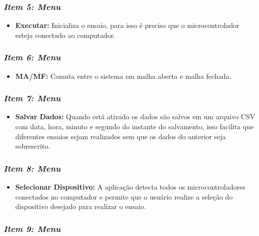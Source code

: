 \subsubsection*{\textit{Item 5: Menu}}

\begin{itemize}
        \setlength{\itemsep}{-2pt}
	\item \textbf{Executar:} Inicializa o ensaio, para isso é preciso que o microcontrolador esteja conectado ao computador.
\end{itemize}


\subsubsection*{\textit{Item 6: Menu}}

\begin{itemize}
        \setlength{\itemsep}{-2pt}
	\item \textbf{MA/MF:} Comuta entre o sistema em malha aberta e malha fechada.
\end{itemize}


\subsubsection*{\textit{Item 7: Menu}}

\begin{itemize}
        \setlength{\itemsep}{-2pt}
	\item \textbf{Salvar Dados:} Quando está ativado os dados são salvos em um arquivo CSV com data, hora, minuto e segundo do instante do salvamento, isso facilita que diferentes ensaios sejam realizados sem que os dados do anterior seja sobrescrito.
\end{itemize}


\subsubsection*{\textit{Item 8: Menu }}

\begin{itemize}
        \setlength{\itemsep}{-2pt}
	\item \textbf{Selecionar Dispositivo:} A aplicação detecta todos os microcontroladores conectados no computador e permite que o usuário realize a seleção do dispositivo desejado para realizar o ensaio.
\end{itemize}


\subsubsection*{\textit{Item 9: Menu}}

